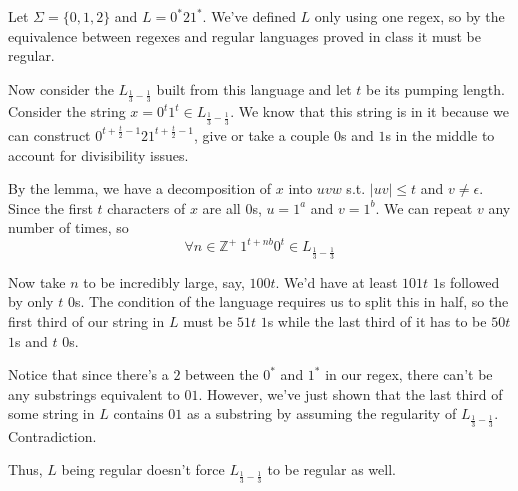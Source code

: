 \documentclass[12pt]{article}
\begin{document}
Let $\Sigma=\{0, 1, 2\}$ and $L=0^* 2 1^*$.
We've defined $L$ only using one regex, so by the equivalence between
regexes and regular languages proved in class it must be regular.

Now consider the $L_{\frac{1}{3}-\frac{1}{3}}$ built from this language and
let $t$ be its pumping length.
Consider the string $x=0^t 1^t \in L_{\frac{1}{3}-\frac{1}{3}}$.
We know that this string is in it because we can construct
$0^{t+\frac{t}{2}-1} 2 1^{t+\frac{t}{2}-1}$, give or take a couple
$0$s and $1$s in the middle to account for divisibility issues.

By the lemma, we have a decomposition of $x$ into $uvw$ s.t. $|uv| \le t$ and $v \ne \epsilon$.
Since the first $t$ characters of $x$ are all $0$s, $u=1^a$ and $v=1^b$.
We can repeat $v$ any number of times, so
\[\forall n \in \mathbb{Z}^+\ 1^{t+nb}0^t \in L_{\frac{1}{3}-\frac{1}{3}}\]

Now take $n$ to be incredibly large, say, $100t$.
We'd have at least $101t$ $1$s followed by only $t$ $0$s.
The condition of the language requires us to split this in half,
so the first third of our string in $L$ must be $51t$ $1$s
while the last third of it has to be $50t$ $1$s and $t$ $0$s.

Notice that since there's a $2$ between the $0^*$ and $1^*$ in our regex,
there can't be any substrings equivalent to $01$.
However, we've just shown that the last third of some string in $L$
contains $01$ as a substring by assuming the regularity of $L_{\frac{1}{3}-\frac{1}{3}}$.
Contradiction.

Thus, $L$ being regular doesn't force $L_{\frac{1}{3}-\frac{1}{3}}$ to be regular as well.
\end{document}
